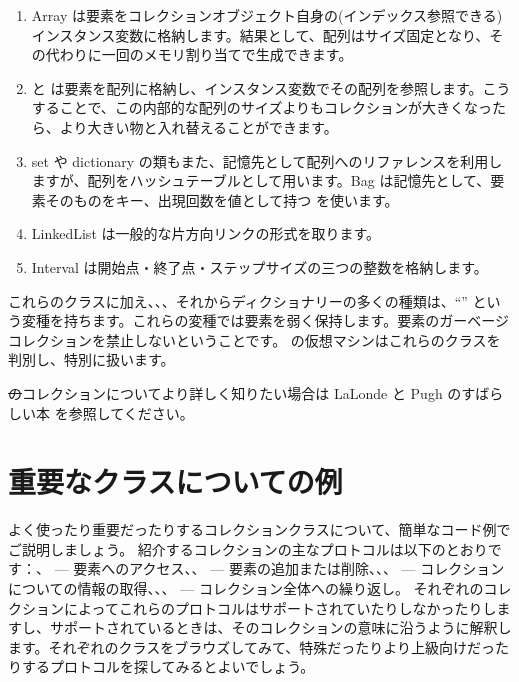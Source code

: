 \documentclass[a4paper,10pt,twoside]{book}
\begin{document}
\begin{enumerate}
  \item Array は要素をコレクションオブジェクト自身の(インデックス参照できる)インスタンス変数に格納します。結果として、配列はサイズ固定となり、その代わりに一回のメモリ割り当てで生成できます。
  \item {} と  は要素を配列に格納し、インスタンス変数でその配列を参照します。こうすることで、この内部的な配列のサイズよりもコレクションが大きくなったら、より大きい物と入れ替えることができます。
  \item set や dictionary の類もまた、記憶先として配列へのリファレンスを利用しますが、配列をハッシュテーブルとして用います。Bag は記憶先として、要素そのものをキー、出現回数を値として持つ  を使います。
  \item LinkedList は一般的な片方向リンクの形式を取ります。
  \item Interval は開始点・終了点・ステップサイズの三つの整数を格納します。
\end{enumerate}
これらのクラスに加え、、、それからディクショナリーの多くの種類は、``'' という変種を持ちます。これらの変種では要素を弱く保持します。\ie 要素のガーベージコレクションを禁止しないということです。
\pharo の仮想マシンはこれらのクラスを判別し、特別に扱います。

\st のコレクションについてより詳しく知りたい場合は LaLonde と Pugh のすばらしい本\cite{LaLo90a} を参照してください。

\section{重要なクラスについての例}
よく使ったり重要だったりするコレクションクラスについて、簡単なコード例でご説明しましょう。
紹介するコレクションの主なプロトコルは以下のとおりです：、 --- 要素へのアクセス、、 --- 要素の追加または削除、、、 --- コレクションについての情報の取得、、、 --- コレクション全体への繰り返し。
それぞれのコレクションによってこれらのプロトコルはサポートされていたりしなかったりしますし、サポートされているときは、そのコレクションの意味に沿うように解釈します。それぞれのクラスをブラウズしてみて、特殊だったりより上級向けだったりするプロトコルを探してみるとよいでしょう。
\end{document}
